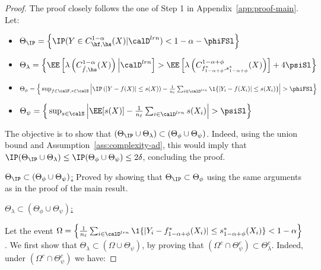 \begin{proof}
    The proof closely follows the one of Step 1 in Appendix~\ref{app:proof-main}.
    Let:
    \begin{itemize}
        \item $\Theta_\IP=\Big\{\IP(Y\in C_{\hf,\hs}^{1-\alpha}(X)|\calD^{lrn})< 1-\alpha - \phiFSl\Big\}$
        \item $\Theta_\lambda=\Big\{\EE\left[\lambda\left(C_{\hat{f},\hs}^{1-\alpha}(X)\right)\Big|\calD^{lrn}\right] > \EE\left[\lambda\left(C_{f_{1-\alpha+\phi}^*,s_{1-\alpha+\phi}^*}^{1-\alpha + \phi}(X)\right)\right] + 4\psiSl\Big\}$
        \item $\Theta_\phi=\Big\{\sup_{f\in\calF,s\in\calS}\Big|\IP\left(|Y-f(X)|\leq s(X)\right) - \frac{1}{n_\ell}\sum_{i\in\calD^{lrn}}\1\{|Y_i-f(X_i)|\leq s(X_i)\}\Big|> \phiFSl\Big\}$
        \item $\Theta_\psi = \Big\{\sup_{s\in\calS}\Big|\EE[s(X)] - \frac{1}{n_\ell}\sum_{i\in\calD^{lrn}} s(X_i)\Big|> \psiSl\Big\}$
    \end{itemize}

The objective is to show that $(\Theta_\IP\cup\Theta_\lambda) \subset (\Theta_\phi \cup \Theta_\psi)$. Indeed, using the union bound and Assumption~\ref{ass:complexity-ad}, this would imply that $\IP(\Theta_\IP\cup\Theta_\lambda)\leq \IP(\Theta_\phi\cup \Theta_\psi)\leq 2\delta$, concluding the proof.

\underline{$\Theta_\IP\subset  (\Theta_\phi \cup \Theta_\psi)$:} Proved by showing that $\Theta_\IP\subset \Theta_\phi$ using the same arguments as in the proof of the main result.

\underline{$\Theta_\lambda\subset (\Theta_\phi \cup \Theta_\psi)$:}

Let the event $\Omega=\Big\{\frac{1}{n_\ell}\sum_{i\in\calD^{lrn}}\1\{|Y_i-f_{1-\alpha+\phi}^*(X_i)|\leq s_{1-\alpha+\phi}^*(X_i)\}<1-\alpha\Big\}$. We first show that $\Theta_\lambda\subset (\Omega \cup \Theta_\psi)$, by proving that $(\Omega^c \cap \Theta^c_\psi)\subset \Theta_\lambda^c$. Indeed, under $(\Omega^c \cap \Theta^c_\psi)$ we have:


\end{proof}
